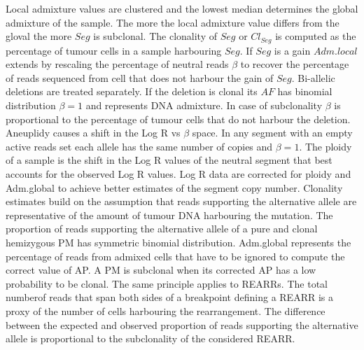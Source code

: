	Local admixture values are clustered and the lowest median determines the global admixture of the sample.
	The more the local admixture value differs from the gloval the more $Seg$ is subclonal.
	The clonality of $Seg$ or $Cl_{Seg}$ is computed as the percentage of tumour cells in a sample harbouring $Seg$.
	If $Seg$ is a gain $Adm.local$ extends by rescaling the percentage of neutral reads $\beta$ to recover the percentage of reads sequenced from cell that does not harbour the gain of $Seg$.
	Bi-allelic deletions are treated separately.
	If the deletion is clonal its $AF$ has binomial distribution $\beta=1$ and represents DNA admixture.
	In case of subclonality $\beta$ is proportional to the percentage of tumour cells that do not harbour the deletion.
	Aneuplidy causes a shift in the Log R vs $\beta$ space.
	In any segment with an empty active reads set each allele has the same number of copies and $\beta=1$.
	The ploidy of a sample is the shift in the Log R values of the neutral segment that best accounts for the observed Log R values.
	Log R data are corrected for ploidy and Adm.global to achieve better estimates of the segment copy number.
	Clonality estimates build on the assumption that reads supporting the alternative allele are representative of the amount of tumour DNA harbouring the mutation.
	The proportion of reads supporting the alternative allele of a pure and clonal hemizygous PM has symmetric binomial distribution.
	Adm.global represents the percentage of reads from admixed cells that have to be ignored to compute the correct value of AP.
	A PM is subclonal when its corrected AP has a low probability to be clonal.
	The same principle applies to REARRs.
	The total numberof reads that span both sides of a breakpoint defining a REARR is a proxy of the number of cells harbouring the rearrangement.
	The difference between the expected and observed proportion of reads supporting the alternative allele is proportional  to the subclonality of the considered REARR.

